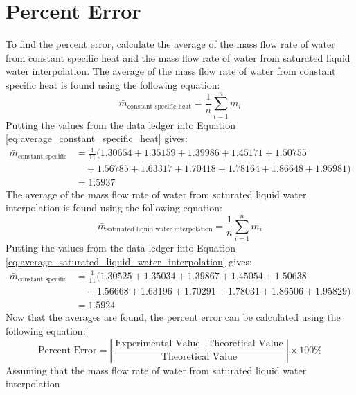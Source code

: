 \documentclass[12pt, titlepage]{article}
\begin{document}
\section{Percent Error}
To find the percent error, calculate the average of the mass flow rate of water
from constant specific heat and the mass flow rate of water from saturated liquid
water interpolation. The average of the mass flow rate of water from constant
specific heat is found using the following equation:
\begin{equation}
  \bar{m}_{\text{constant specific heat}} = \frac{1}{n}\sum_{i=1}^{n}m_i
  \label{eq:average_constant_specific_heat}
\end{equation}
Putting the values from the data ledger into Equation
\ref{eq:average_constant_specific_heat} gives:
\begin{align}
  \bar{m}_{\text{constant specific heat}} &= \frac{1}{11}(1.30654 + 1.35159 + 1.39986 + 1.45171 + 1.50755 \nonumber \\
  &\quad + 1.56785 + 1.63317 + 1.70418 + 1.78164 + 1.86648 + 1.95981) \nonumber \\
  &= 1.5937
  \label{eq:average_constant_specific_heat_values}
\end{align}
The average of the mass flow rate of water from saturated liquid water interpolation
is found using the following equation:
\begin{equation}
  \bar{m}_{\text{saturated liquid water interpolation}} = \frac{1}{n}\sum_{i=1}^{n}m_i
  \label{eq:average_saturated_liquid_water_interpolation}
\end{equation}
Putting the values from the data ledger into Equation
\ref{eq:average_saturated_liquid_water_interpolation} gives:
\begin{align}
  \bar{m}_{\text{constant specific heat}} &= \frac{1}{11}(1.30525 + 1.35034 + 1.39867 + 1.45054 + 1.50638 \nonumber \\
  &\quad + 1.56668 + 1.63196 + 1.70291 + 1.78031 + 1.86506 + 1.95829) \nonumber \\
  &= 1.5924
  \label{eq:average_saturated_liquid_water_interpolation_values}
\end{align}
Now that the averages are found, the percent error can be calculated using the
following equation:
\begin{equation}
  \text{Percent Error} = \left| \frac{\text{Experimental Value} - \text{Theoretical Value}}{\text{Theoretical Value}}\right| \times 100\%
  \label{eq:percent_error}
\end{equation}
Assuming that the mass flow rate of water from saturated liquid water interpolation
\end{document}
